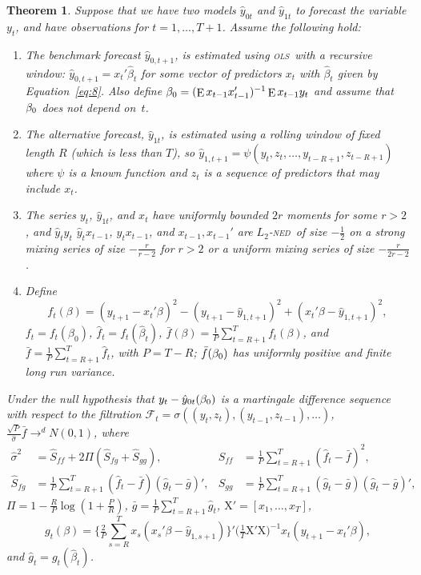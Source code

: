 \documentclass[11pt,fleqn]{article}
\newtheorem{thm}{Theorem}
\theoremstyle{definition}
\DeclareMathOperator{\E}{E}
\newcommand{\btrue}[1][]{\if#1*\hat\beta_{T+1}\else\beta_0\fi}
\newcommand{\X}{\ensuremath{\mathrm{X}}}
\newcommand{\osum}[1]{\sum_{#1=R+1}^T}
\newcommand{\oavg}[1]{\tfrac{1}{P} \osum{#1}}
\newcommand{\ned}{\textsc{ned}}
\newcommand{\ols}{\textsc{ols}}
\begin{document}
\begin{thm}\label{res:1}
  Suppose that we have two models $\hat{y}_{0t}$ and $\hat{y}_{1t}$ to
  forecast the variable $y_t$, and have observations for
  $t=1,\dots,T+1$.  Assume the following hold:
  \begin{enumerate}
  \item \label{item:1} The benchmark forecast $\hat{y}_{0,t+1}$, is
    estimated using \ols\ with a recursive window:
    $\hat{y}_{0,t+1} = x_t'\hat{\beta}_t$ for some vector of
    predictors $x_t$ with $\hat{\beta}_t$ given by
    Equation~\eqref{eq:8}.  Also define $\btrue = (\E x_{t-1}
    x_{t-1}')^{-1} \E x_{t-1} y_t$ and assume that $\btrue$ does not depend
    on~$t$.
  \item \label{item:2} The alternative forecast, $\hat{y}_{1t}$, is
    estimated using a rolling window of fixed length $R$ (which is
    less than $T$), so $\hat{y}_{1,t+1} =
    \psi(y_t,z_t,\dots,y_{t-R+1}, z_{t-R+1})$ where $\psi$ is a known
    function and $z_t$ is a sequence of predictors that may include
    $x_t$.
  \item \label{item:3} The series $y_t$, $\hat{y}_{1t}$, and $x_t$
    have uniformly bounded $2 r$ moments for some $r > 2$, and $\hat
    y_t y_t$ $\hat y_t x_{t-1}$, $y_t x_{t-1}$, and $x_{t-1},
    x_{t-1}'$ are $L_2$-\ned\ of size $-\frac12$ on a strong mixing
    series of size $-\frac{r}{r-2}$ for $r>2$ or a uniform mixing
    series of size $-\frac{r}{2r-2}$.
  \item \label{item:4} Define \[f_t(\beta) = (y_{t+1} - x_t'\beta)^2 -
    (y_{t+1} - \hat{y}_{1,t+1})^2 + (x_t'\beta - \hat{y}_{1,t+1})^2,\]
    $f_t = f_t(\beta_0)$, $\hat f_t = f_t(\hat\beta_t)$,
    $\bar{f}(\beta) = \oavg{t} f_t(\beta)$, and $\bar f
    = \tfrac1P \sum_{t=R+1}^{T} \hat f_t$, with $P = T - R$;
    $\bar f(\btrue)$ has uniformly positive and finite long run
    variance.
  \end{enumerate}
  Under the null hypothesis that $y_t - \hat{y}_{0t}(\btrue)$ is a
  martingale difference sequence with respect to the filtration
  $\mathcal{F}_t = \sigma((y_t, z_{t}), (y_{t-1}, z_{t-1}),\dots)$,
  $\tfrac{\sqrt{P}}{\hat\sigma} \bar f \to^d N(0,1)$, where 
  \begin{align*}
    \hat{\sigma}^2 &= \hat{S}_{ff} + 2 \Pi (\hat{S}_{fg} + \hat{S}_{gg}), &
    \hat{S}_{ff} &= \oavg{t} (\hat f_t - \bar f)^2, \\
    \hat{S}_{fg} &= \oavg{t} (\hat f_t - \bar{f})(\hat g_t - \bar g)', &
    \hat{S}_{gg} &= \oavg{t} (\hat g_t - \bar g)(\hat g_t - \bar g)',
  \end{align*}
  $\Pi = 1 - \tfrac{R}{P} \log(1 + \tfrac{P}{R})$, $\bar{g} = \oavg{t}
  \hat g_t$, $\X' = [x_1,\dots,x_T]$,
  \begin{equation*}
    g_t(\beta) =
    \Big\{\tfrac{2}{P}\sum_{s=R}^T x_s (x_s'\beta - \hat{y}_{1,s+1}) \Big\}'
    \big(\tfrac1T \X'\X \big)^{-1} x_t(y_{t+1} - x_t'\beta),
  \end{equation*}
  and $\hat g_t = g_t(\hat\beta_t)$.
\end{thm}
\end{document}
